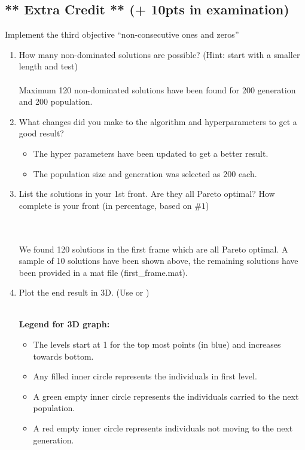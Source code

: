 \documentclass{article}
\begin{document}
\subsection{** Extra Credit ** (+ 10pts in examination)}
Implement the third objective ``non-consecutive ones and zeros''
\begin{enumerate}
	\item How many non-dominated solutions are possible? (Hint: start with a smaller length and test)\\ \\
	{\color{blue}Maximum 120 non-dominated solutions have been found for 200 generation and 200 population. }
	\item What changes did you make to the algorithm and hyperparameters to get a good result?
	{\color{blue}
		\begin{itemize}
			\item The hyper parameters have been updated to get a better result. \item The population size and generation was selected as 200 each.
		\end{itemize}
	}
	\item List the solutions in your 1st front. Are they all Pareto optimal? How complete is your front (in percentage, based on $\#1$)
	
	{\color{blue}\\\\
		We found 120 solutions in the first frame which are all Pareto optimal. 
		A sample of 10 solutions have been shown above, the remaining solutions have been provided in a mat file (first\_frame.mat).
	}
	\item Plot the end result in 3D. (Use  or ) \\ \\ 
	{\color{blue} \textbf{Legend for 3D graph:} 
		\begin{itemize}
			\item The levels start at 1 for the top most points (in blue) and increases towards bottom.
			\item Any filled inner circle represents the individuals in first level.
			\item A green empty inner circle represents the  individuals carried to the next population.
			\item A red empty inner circle represents individuals not moving to the next generation.
		\end{itemize}
	}
	

\end{enumerate}
\end{document}
